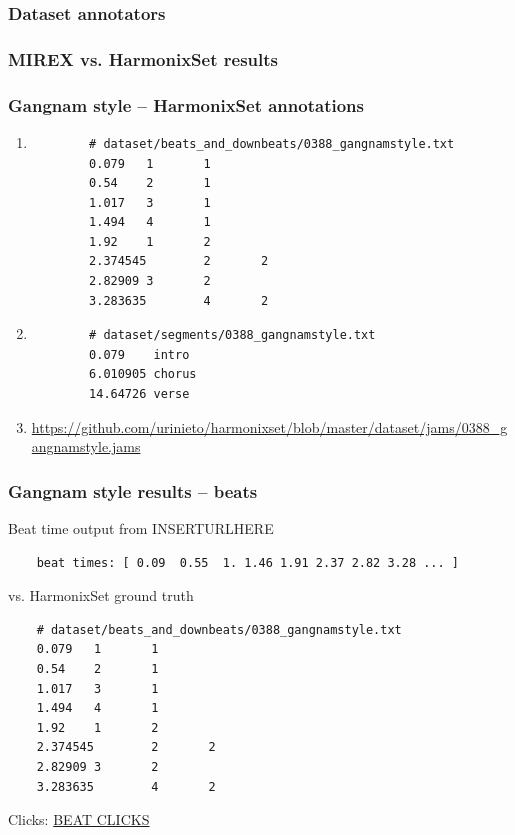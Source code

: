 \documentclass{beamer}
\begin{document}

\begin{frame}
	\frametitle{Dataset annotators}
\end{frame}

\begin{frame}
	\frametitle{MIREX vs. HarmonixSet results}
\end{frame}


\begin{frame}[fragile]
	\frametitle{Gangnam style -- HarmonixSet annotations}
	\begin{enumerate}
		\item
		\begin{verbatim}
		# dataset/beats_and_downbeats/0388_gangnamstyle.txt
		0.079   1       1
		0.54    2       1
		1.017   3       1
		1.494   4       1
		1.92    1       2
		2.374545        2       2
		2.82909 3       2
		3.283635        4       2
		\end{verbatim}
		\item
		\begin{verbatim}
		# dataset/segments/0388_gangnamstyle.txt
		0.079    intro
		6.010905 chorus
		14.64726 verse
		\end{verbatim}
		\item
		\href{https://github.com/urinieto/harmonixset/blob/master/dataset/jams/0388_gangnamstyle.jams}{https://github.com/urinieto/harmonixset/blob/master/dataset/jams/0388\_gangnamstyle.jams}
	\end{enumerate}

\end{frame}

\begin{frame}[fragile]
	\frametitle{Gangnam style results -- beats}
	Beat time output from INSERTURLHERE
	\begin{verbatim}
	beat times: [ 0.09  0.55  1. 1.46 1.91 2.37 2.82 3.28 ... ]
	\end{verbatim}
	vs. HarmonixSet ground truth
	\begin{verbatim}
	# dataset/beats_and_downbeats/0388_gangnamstyle.txt
	0.079   1       1
	0.54    2       1
	1.017   3       1
	1.494   4       1
	1.92    1       2
	2.374545        2       2
	2.82909 3       2
	3.283635        4       2
	\end{verbatim}
	Clicks: \href{run:./gangnam_beats.wav}{BEAT CLICKS}
\end{frame}
\end{document}
